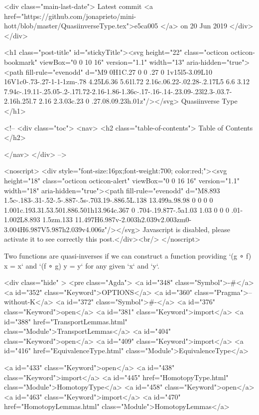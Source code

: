     <div class="main-last-date">
      Latest commit <a href="https://github.com/jonaprieto/mini-hott/blob/master/QuasiinverseType.tex">e5ca005 </a> on  20 Jun 2019
    </div>
  </div>
  
  <h1 class="post-title" id="stickyTitle"><svg height="22" class="octicon octicon-bookmark" viewBox="0 0 10 16" version="1.1" width="13" aria-hidden="true"><path fill-rule="evenodd" d="M9 0H1C.27 0 0 .27 0 1v15l5-3.09L10 16V1c0-.73-.27-1-1-1zm-.78 4.25L6.36 5.61l.72 2.16c.06.22-.02.28-.2.17L5 6.6 3.12 7.94c-.19.11-.25.05-.2-.17l.72-2.16-1.86-1.36c-.17-.16-.14-.23.09-.23l2.3-.03.7-2.16h.25l.7 2.16 2.3.03c.23 0 .27.08.09.23h.01z"/></svg> Quasiinverse Type
  </h1>

  <!-- 
  <div class="toc">
    <nav>
    <h2 class="table-of-contents"> Table of Contents </h2>
      

    </nav>
  </div>
   -->

  <noscript>
  <div style="font-size:16px;font-weight:700; color:red;"><svg height="18" class="octicon octicon-alert" viewBox="0 0 16 16" version="1.1" width="18" aria-hidden="true"><path fill-rule="evenodd" d="M8.893 1.5c-.183-.31-.52-.5-.887-.5s-.703.19-.886.5L.138 13.499a.98.98 0 0 0 0 1.001c.193.31.53.501.886.501h13.964c.367 0 .704-.19.877-.5a1.03 1.03 0 0 0 .01-1.002L8.893 1.5zm.133 11.497H6.987v-2.003h2.039v2.003zm0-3.004H6.987V5.987h2.039v4.006z"/></svg> Javascript is disabled, please activate it to see correctly this post.</div><br/>
  </noscript>

  Two functions are quasi-inverses if we can construct a function providing
`(g ∘ f) x = x` and `(f ∘ g) y = y` for any given `x` and `y`.

<div class="hide" >
<pre class="Agda">
<a id="348" class="Symbol">{-#</a> <a id="352" class="Keyword">OPTIONS</a> <a id="360" class="Pragma">--without-K</a> <a id="372" class="Symbol">#-}</a>
<a id="376" class="Keyword">open</a> <a id="381" class="Keyword">import</a> <a id="388" href="TransportLemmas.html" class="Module">TransportLemmas</a>
<a id="404" class="Keyword">open</a> <a id="409" class="Keyword">import</a> <a id="416" href="EquivalenceType.html" class="Module">EquivalenceType</a>

<a id="433" class="Keyword">open</a> <a id="438" class="Keyword">import</a> <a id="445" href="HomotopyType.html" class="Module">HomotopyType</a>
<a id="458" class="Keyword">open</a> <a id="463" class="Keyword">import</a> <a id="470" href="HomotopyLemmas.html" class="Module">HomotopyLemmas</a>


